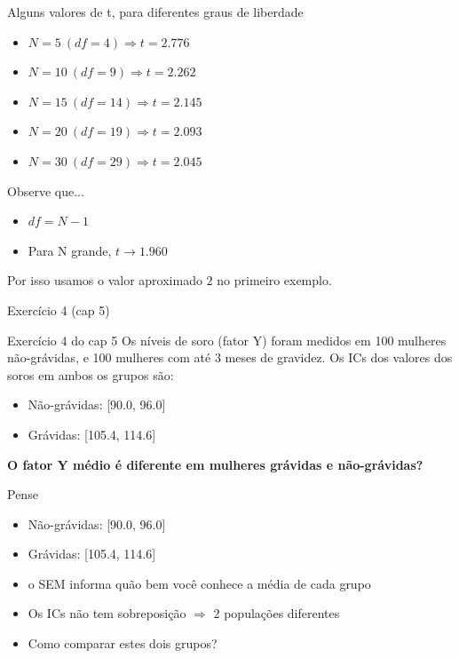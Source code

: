 \documentclass{beamer}
\begin{document}
\begin{frame}{Alguns valores de t, para diferentes graus de liberdade}
  \begin{itemize}
  \item $N = 5\ (df = 4) \Rightarrow t = 2.776$
  \item $N = 10\ (df = 9) \Rightarrow t = 2.262$
  \item $N = 15\ (df = 14) \Rightarrow t = 2.145$
  \item $N = 20\ (df = 19) \Rightarrow t = 2.093$
  \item $N = 30\ (df = 29) \Rightarrow t = 2.045$
  \end{itemize}
  \begin{block}{Observe que...}
    \begin{itemize}
    \item $df = N - 1$
    \item Para N  grande, $t \rightarrow 1.960$
    \end{itemize}
    Por isso usamos o valor aproximado $2$ no primeiro exemplo.
  \end{block}
\end{frame}

\begin{frame}[label=exercicio5.4]{Exercício 4 (cap 5)}
  \begin{exampleblock}{Exercício 4 do cap 5}
    Os níveis de soro (fator Y) foram medidos em 100 mulheres não-grávidas, e 100 mulheres com até 3 meses de gravidez. Os ICs dos valores dos soros em ambos os grupos são:
    \begin{itemize}
    \item Não-grávidas: [90.0, 96.0]
    \item Grávidas: [105.4, 114.6]
    \end{itemize}

    \bigskip
    {\bf O fator Y médio é diferente em mulheres grávidas e não-grávidas?}
  \end{exampleblock}
\end{frame}

\begin{frame}{Pense}
  \begin{exampleblock}{}
    \begin{itemize}
    \item Não-grávidas: [90.0, 96.0]
    \item Grávidas: [105.4, 114.6]
    \end{itemize}
  \end{exampleblock}
  \begin{itemize}
  \item o SEM informa quão bem você conhece a média de cada grupo
  \item Os ICs não tem sobreposição $\Rightarrow$ 2 populações diferentes
  \item Como comparar estes dois grupos?
  \end{itemize}
\end{frame}
\end{document}

